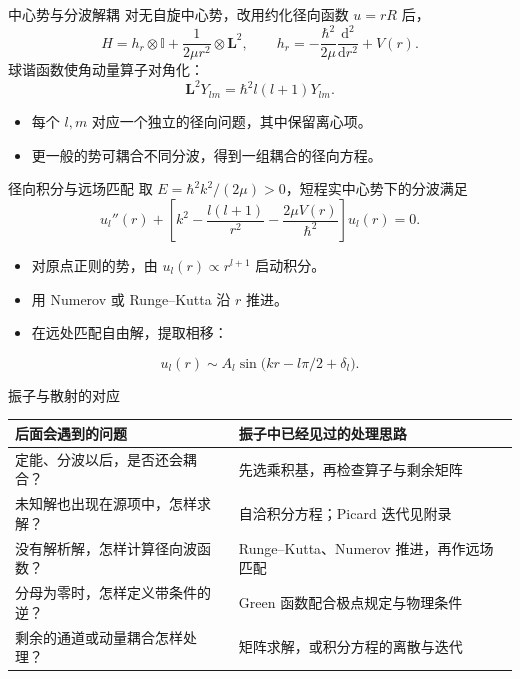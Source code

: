 \documentclass[aspectratio=169,11pt]{beamer}
\newcommand{\dd}{\mathrm d}
\newcommand{\id}{\mathbb I}
\begin{document}
\begin{frame}{中心势与分波解耦}
对无自旋中心势，改用约化径向函数 $u=rR$ 后，
\[
H=h_r\otimes\id+\frac{1}{2\mu r^2}\otimes\bm L^2,
\qquad
h_r=-\frac{\hbar^2}{2\mu}\frac{\dd^2}{\dd r^2}+V(r).
\]
球谐函数使角动量算子对角化：
\[
\bm L^2Y_{lm}=\hbar^2l(l+1)Y_{lm}.
\]
\begin{itemize}
\item 每个 $l,m$ 对应一个独立的径向问题，其中保留离心项。
\item 更一般的势可耦合不同分波，得到一组耦合的径向方程。
\end{itemize}
\end{frame}

\begin{frame}{径向积分与远场匹配}
取 $E=\hbar^2k^2/(2\mu)>0$，短程实中心势下的分波满足
\[
u_l''(r)+\left[k^2-\frac{l(l+1)}{r^2}
-\frac{2\mu V(r)}{\hbar^2}\right]u_l(r)=0.
\]
\begin{itemize}
\item 对原点正则的势，由 $u_l(r)\propto r^{l+1}$ 启动积分。
\item 用 Numerov 或 Runge--Kutta 沿 $r$ 推进。
\item 在远处匹配自由解，提取相移：
\end{itemize}
\[
u_l(r)\sim A_l\sin\bigl(kr-l\pi/2+\delta_l\bigr).
\]
\end{frame}

\begin{frame}{振子与散射的对应}
\renewcommand{\arraystretch}{1.45}
\begin{tabular}{@{}p{}p{}@{}}
\textbf{后面会遇到的问题}&\textbf{振子中已经见过的处理思路}\\\hline
定能、分波以后，是否还会耦合？&先选乘积基，再检查算子与剩余矩阵\\
未知解也出现在源项中，怎样求解？&自洽积分方程；Picard 迭代见附录\\
没有解析解，怎样计算径向波函数？&Runge--Kutta、Numerov 推进，再作远场匹配\\
分母为零时，怎样定义带条件的逆？&Green 函数配合极点规定与物理条件\\
剩余的通道或动量耦合怎样处理？&矩阵求解，或积分方程的离散与迭代
\end{tabular}
\end{frame}
\end{document}
